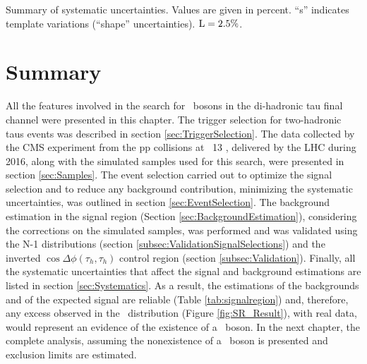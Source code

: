 \begin{table}[ht]
\begin{center}
 \caption{Summary of systematic uncertainties. Values are given in                                                                                                                      
   percent.  ``s'' indicates template variations (``shape''                                                                                                                             
   uncertainties). $\rm L=2.5\%$.}                                                                                                                                                      
 \label{table:SystematicsTable}                                                                                                                                                         
 \end{center}
\end{table} 

\section{Summary}
\label{Summary}

All the features involved in the search for \Zprime~bosons in the di-hadronic tau final 
channel were presented in this chapter. The trigger selection for two-hadronic taus events
was described in section \ref{sec:TriggerSelection}. The data collected by the CMS experiment 
from the pp collisions at \sqrts~13 \TeV, delivered by the LHC during 2016, along with
the simulated samples used for this search, were presented in section \ref{sec:Samples}. The event selection 
carried out to optimize the signal selection and to reduce any background 
contribution, minimizing the systematic uncertainties, was outlined in 
section \ref{sec:EventSelection}. The background estimation in the signal region (Section \ref{sec:BackgroundEstimation}), 
considering the corrections on the simulated samples, was performed and was validated using the 
N-1 distributions (section \ref{subsec:ValidationSignalSelections}) and the inverted 
$\cos \Delta\phi(\tau_{h},\tau_{h})$ control region (section \ref{subsec:Validation}). Finally, all the systematic
uncertainties that affect the signal and background estimations are listed in section \ref{sec:Systematics}.
As a result, the estimations of the backgrounds and of the expected signal are 
reliable (Table \ref{tab:signalregion}) and, therefore, any excess observed in the 
\mass~distribution (Figure \ref{fig:SR_Result}), with real data, would represent an evidence of 
the existence of a \Zprime~boson. In the next chapter, the complete analysis, 
assuming the nonexistence of a \Zprime~boson is presented and exclusion limits are estimated.


% 


